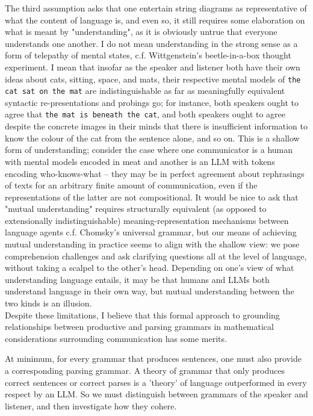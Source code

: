 The third assumption asks that one entertain string diagrams as representative of what the content of language is, and even so, it still requires some elaboration on what is meant by "understanding", as it is obviously untrue that everyone understands one another. I do not mean understanding in the strong sense as a form of telepathy of mental states, c.f. Wittgenstein's beetle-in-a-box thought experiment. I mean that insofar as the speaker and listener both have their own ideas about cats, sitting, space, and mats, their respective mental models of \texttt{the cat sat on the mat} are indistinguishable as far as meaningfully equivalent syntactic re-presentations and probings go; for instance, both speakers ought to agree that \texttt{the mat is beneath the cat}, and both speakers ought to agree despite the concrete images in their minds that there is insufficient information to know the colour of the cat from the sentence alone, and so on. This is a shallow form of understanding; consider the case where one communicator is a human with mental models encoded in meat and another is an LLM with tokens encoding who-knows-what -- they may be in perfect agreement about rephrasings of texts for an arbitrary finite amount of communication, even if the representations of the latter are not compositional. It would be nice to ask that "mutual understanding" requires structurally equivalent (as opposed to extensionally indistinguishable) meaning-representation mechanisms between language agents c.f. Chomsky's universal grammar, but our means of achieving mutual understanding in practice seems to align with the shallow view: we pose comprehension challenges and ask clarifying questions all at the level of language, without taking a scalpel to the other's head. Depending on one's view of what understanding language entails, it may be that humans and LLMs both understand language in their own way, but mutual understanding between the two kinds is an illusion.\\

Despite these limitations, I believe that this formal approach to grounding relationships between productive and parsing grammars in mathematical considerations surrounding communication has some merits.

 At minimum, for every grammar that produces sentences, one must also provide a corresponding parsing grammar. A theory of grammar that only produces correct sentences or correct parses is a 'theory' of language outperformed in every respect by an LLM. So we must distinguish between grammars of the speaker and listener, and then investigate how they cohere.\\


